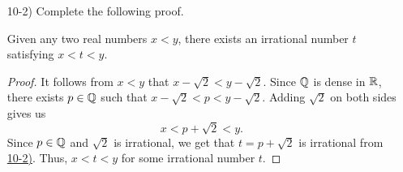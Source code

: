 \documentclass[11pt,a4paper]{article}
\begin{document}
\begin{enumerate}
\begin{enumerate}
            \begin{proof}
            Suppose \( p \in \Q  \) and \( t  \) is an irrational number. Suppose for sake of contradiction that \(  p + t  \) is an rational number. Then there exists \( x,y \in \Z  \) with \( y \neq 0  \) such that 
            \[  p + t = \frac{ x }{ y }. \]
           Subtracting \( p  \) on both sides, we get 
           \[  t = \frac{ x }{ y }  - p. \]
           Since \( \Q  \) is a field and \( \frac{ x }{ y } , p \in \Q  \), we get that \( \frac{ x }{ y } - p \in \Q    \). But this tells us that \( t  \) is a rational number which is a contradiction. Thus, \( t  \) must be irrational.
            \end{proof}
        \item[10-2)] Complete the following proof. \label{10-2)}
            \begin{theorem}
                Given any two real numbers \( x < y  \), there exists an irrational number \( t  \) satisfying \( x < t < y  \).
            \end{theorem}
            \begin{proof}
            It follows from \( x < y  \) that \( x - \sqrt{ 2 }  < y - \sqrt{ 2 }  \). Since \( \Q  \) is dense in \( \mathbb{R}  \), there exists \( p \in \Q  \) such that \( x - \sqrt{ 2 }  < p < y - \sqrt{ 2 }  \). Adding \( \sqrt{ 2 }  \) on both sides gives us   
            \[  x < p + \sqrt{ 2 } < y. \]
            Since \( p \in \Q   \) and \( \sqrt{ 2 }  \) is irrational, we get that \( t = p + \sqrt{ 2 }  \) is irrational from {\hyperref[10-2)]{10-2)}}. Thus, \( x < t < y  \) for some irrational number \( t  \).


\end{proof}
\end{enumerate}
\end{enumerate}
\end{document}
